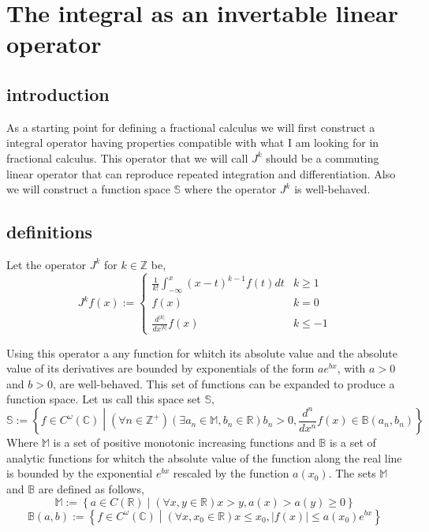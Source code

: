 \documentclass[%
 onecolumn,
 amsmath, amssymb, aps, pra, 10pt
]{revtex4-2}
\begin{document}
\appendix*

\section{The integral as an invertable linear operator}

\subsection{introduction}
As a starting point for defining a fractional calculus we will first construct a integral operator having properties compatible with what I am looking for in fractional calculus. This operator that we will call $J^k$ should be a commuting linear operator that can reproduce repeated integration and differentiation. Also we will construct a function space $\mathbb{S}$ where the operator $J^k$ is well-behaved.

\subsection{definitions}
Let the operator $J^k$ for $k \in \mathbb{Z}$ be,
\begin{equation}
J^k f(x) := \begin{cases} \frac{1}{k!}\int_{-\infty}^x (x - t)^{k - 1}f(t)dt & k \geq 1 \\ f(x) & k = 0 \\ \frac{d^{\left|k\right|}}{dx^{\left|k\right|}}f(x) & k \leq -1 \end{cases}
\label{integer_calculus}
\end{equation}

Using this operator a any function for whitch its absolute value and the absolute value of its derivatives are bounded by exponentials of the form $ae^{bx}$, with $a > 0$ and $b > 0$, are well-behaved. This set of functions can be expanded to produce a function space. Let us call this space set $\mathbb{S}$,
\begin{equation}
\mathbb{S} := \left\lbrace f \in C^\omega(\mathbb{C}) \middle| (\forall n \in \mathbb{Z}^+)(\exists a_n \in \mathbb{M}, b_n \in \mathbb{R}) b_n > 0, \frac{d^n}{dx^n}f(x) \in \mathbb{B}(a_n, b_n) \right\rbrace
\label{exponentialy_bounded}
\end{equation}
Where $\mathbb{M}$ is a set of positive monotonic increasing functions and $\mathbb{B}$ is a set of analytic functions for whitch the absolute value of the function along the real line is bounded by the exponential $e^{bx}$ rescaled by the function $a(x_0)$. The sets $\mathbb{M}$ and $\mathbb{B}$ are defined as follows,
\[\mathbb{M} := \left\lbrace a \in C(\mathbb{R}) \middle| (\forall x, y \in \mathbb{R}) x > y, a(x) > a(y) \geq 0 \right\rbrace\]
\[\mathbb{B}(a, b) := \left\lbrace f \in C^\omega(\mathbb{C}) \middle| (\forall x, x_0 \in \mathbb{R}) x \leq x_0, |f(x)| \leq a(x_0)e^{bx} \right\rbrace\]
\end{document}
